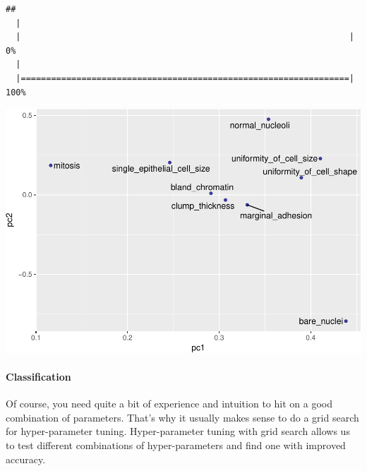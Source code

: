\documentclass[]{article}
\newenvironment{Shaded}{\begin{snugshade}}{\end{snugshade}}
\newcommand{\KeywordTok}[1]{\textcolor[rgb]{0.13,0.29,0.53}{\textbf{{#1}}}}
\newcommand{\DataTypeTok}[1]{\textcolor[rgb]{0.13,0.29,0.53}{{#1}}}
\newcommand{\FloatTok}[1]{\textcolor[rgb]{0.00,0.00,0.81}{{#1}}}
\newcommand{\StringTok}[1]{\textcolor[rgb]{0.31,0.60,0.02}{{#1}}}
\newcommand{\NormalTok}[1]{{#1}}
\let\oldparagraph\paragraph
\renewcommand{\paragraph}[1]{\oldparagraph{#1}\mbox{}}
\begin{document}
\begin{verbatim}
## 
  |                                                                       
  |                                                                 |   0%
  |                                                                       
  |=================================================================| 100%
\end{verbatim}

\begin{Shaded}
\end{Shaded}

\includegraphics{webinar_code_files/figure-latex/pca_features-1.pdf}

\paragraph{Classification}\label{classification-1}

Of course, you need quite a bit of experience and intuition to hit on a
good combination of parameters. That's why it usually makes sense to do
a grid search for hyper-parameter tuning. Hyper-parameter tuning with
grid search allows us to test different combinations of hyper-parameters
and find one with improved accuracy.
\end{document}
